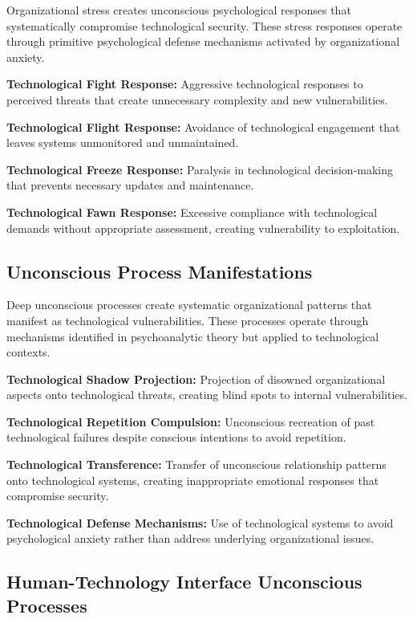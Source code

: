 \documentclass[10pt, twocolumn]{article}
\begin{document}
Organizational stress creates unconscious psychological responses that systematically compromise technological security. These stress responses operate through primitive psychological defense mechanisms activated by organizational anxiety.

\textbf{Technological Fight Response:} Aggressive technological responses to perceived threats that create unnecessary complexity and new vulnerabilities.

\textbf{Technological Flight Response:} Avoidance of technological engagement that leaves systems unmonitored and unmaintained.

\textbf{Technological Freeze Response:} Paralysis in technological decision-making that prevents necessary updates and maintenance.

\textbf{Technological Fawn Response:} Excessive compliance with technological demands without appropriate assessment, creating vulnerability to exploitation.

\subsection{Unconscious Process Manifestations}

Deep unconscious processes create systematic organizational patterns that manifest as technological vulnerabilities. These processes operate through mechanisms identified in psychoanalytic theory but applied to technological contexts.

\textbf{Technological Shadow Projection:} Projection of disowned organizational aspects onto technological threats, creating blind spots to internal vulnerabilities.

\textbf{Technological Repetition Compulsion:} Unconscious recreation of past technological failures despite conscious intentions to avoid repetition.

\textbf{Technological Transference:} Transfer of unconscious relationship patterns onto technological systems, creating inappropriate emotional responses that compromise security.

\textbf{Technological Defense Mechanisms:} Use of technological systems to avoid psychological anxiety rather than address underlying organizational issues.

\subsection{Human-Technology Interface Unconscious Processes}
\end{document}
